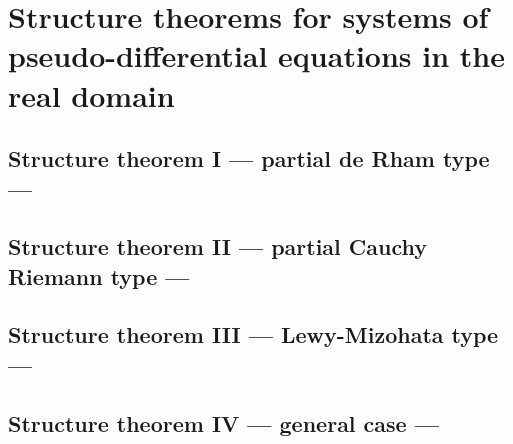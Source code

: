\section{Structure theorems for systems of pseudo-differential equations in the real domain}

\subsection{Structure theorem I --- partial de Rham type ---}

\subsection{Structure theorem II --- partial Cauchy Riemann type ---}

\subsection{Structure theorem III --- Lewy-Mizohata type ---}

\subsection{Structure theorem IV --- general case ---}

